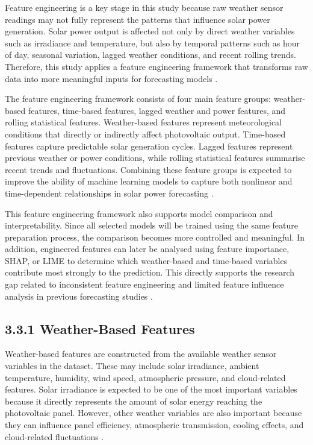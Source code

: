 Feature engineering is a key stage in this study because raw weather sensor readings may not fully represent the patterns that influence solar power generation. Solar power output is affected not only by direct weather variables such as irradiance and temperature, but also by temporal patterns such as hour of day, seasonal variation, lagged weather conditions, and recent rolling trends. Therefore, this study applies a feature engineering framework that transforms raw data into more meaningful inputs for forecasting models \parencite{JnanaVarshitha2025, TsaiLo2025, CarvalhoJunior2025}.

The feature engineering framework consists of four main feature groups: weather-based features, time-based features, lagged weather and power features, and rolling statistical features. Weather-based features represent meteorological conditions that directly or indirectly affect photovoltaic output. Time-based features capture predictable solar generation cycles. Lagged features represent previous weather or power conditions, while rolling statistical features summarise recent trends and fluctuations. Combining these feature groups is expected to improve the ability of machine learning models to capture both nonlinear and time-dependent relationships in solar power forecasting \parencite{Eren2025, Pongphaw2025, Duvuru2026}.

This feature engineering framework also supports model comparison and interpretability. Since all selected models will be trained using the same feature preparation process, the comparison becomes more controlled and meaningful. In addition, engineered features can later be analysed using feature importance, SHAP, or LIME to determine which weather-based and time-based variables contribute most strongly to the prediction. This directly supports the research gap related to inconsistent feature engineering and limited feature influence analysis in previous forecasting studies \parencite{JnanaVarshitha2025, Bakht2025, TsaiLo2025}.

\subsection{3.3.1 Weather-Based Features}

Weather-based features are constructed from the available weather sensor variables in the dataset. These may include solar irradiance, ambient temperature, humidity, wind speed, atmospheric pressure, and cloud-related features. Solar irradiance is expected to be one of the most important variables because it directly represents the amount of solar energy reaching the photovoltaic panel. However, other weather variables are also important because they can influence panel efficiency, atmospheric transmission, cooling effects, and cloud-related fluctuations \parencite{CarvalhoJunior2025, Pongphaw2025, TsaiLo2025}.


